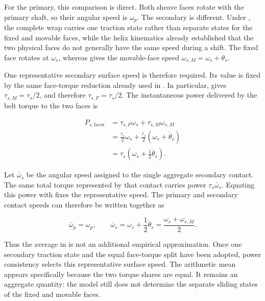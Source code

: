 \documentclass[11pt]{report}
\numberwithin{equation}{section}
\newcounter{assump}
\begin{document}
For the primary, this comparison is direct. Both sheave faces rotate with the
primary shaft, so their angular speed is \(\omega_p\). The secondary is
different. Under , the complete wrap
carries one traction state rather than separate states for the fixed and
movable faces, while the helix kinematics already established that the two
physical faces do not generally have the same speed during a shift. The fixed
face rotates at \(\omega_s\), whereas
 gives the movable-face speed
\(\omega_{s,M}=\omega_s+\dot\theta_s\).

One representative secondary surface speed is therefore required. Its value
is fixed by the same face-torque reduction already used in
. In particular,
 gives
\(\tau_{s,M}=\tau_s/2\), and therefore
\(\tau_{s,F}=\tau_s/2\). The instantaneous power delivered by the belt
torque to the two faces is

\begin{equation}
\begin{aligned}
    P_{s,\mathrm{faces}}
    &=
    \tau_{s,F}\omega_s
    +
    \tau_{s,M}\omega_{s,M}
    \\
    &=
    \frac{\tau_s}{2}\omega_s
    +
    \frac{\tau_s}{2}
    \left(\omega_s+\dot\theta_s\right)
    \\
    &=
    \tau_s
    \left(
        \omega_s+\frac{1}{2}\dot\theta_s
    \right).
\end{aligned}
\label{eq:secondary_face_tangential_power}
\end{equation}

Let \(\bar\omega_s\) be the angular speed assigned to the single aggregate
secondary contact. The same total torque represented by that contact carries
power \(\tau_s\bar\omega_s\). Equating this power with
 fixes the representative speed. The
primary and secondary contact speeds can therefore be written together as

\begin{equation}
\boxed{
    \bar\omega_p=\omega_p,
    \qquad
    \bar\omega_s
    =
    \omega_s+\frac{1}{2}\dot\theta_s
    =
    \frac{\omega_s+\omega_{s,M}}{2}.
}
\label{eq:representative_contact_angular_speed}
\end{equation}

Thus the average in  is not an
additional empirical approximation. Once one secondary traction state and the
equal face-torque split have been adopted, power consistency selects this
representative surface speed. The arithmetic mean appears specifically because the
two torque shares are equal. It remains an aggregate quantity: the model still
does not determine the separate sliding states of the fixed and movable faces.
\end{document}

